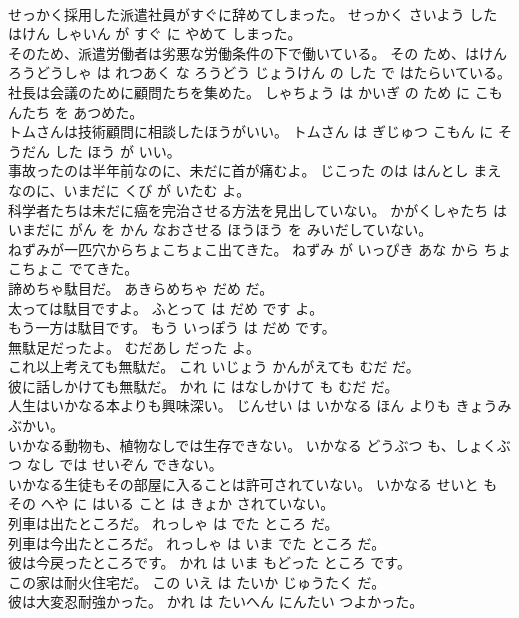 \documentclass[8pt]{extreport}
\begin{document}
\begin{CJK}{UTF8}{min}
\\	せっかく採用した派遣社員がすぐに辞めてしまった。	せっかく さいよう した はけん しゃいん が すぐ に やめて しまった。	
\\	そのため、派遣労働者は劣悪な労働条件の下で働いている。	その ため、はけんろうどうしゃ は れつあく な ろうどう じょうけん の した で はたらいている。	
\\	社長は会議のために顧問たちを集めた。	しゃちょう は かいぎ の ため に こもんたち を あつめた。	
\\	トムさんは技術顧問に相談したほうがいい。	トムさん は ぎじゅつ こもん に そうだん した ほう が いい。	
\\	事故ったのは半年前なのに、未だに首が痛むよ。	じこった のは はんとし まえ なのに、いまだに くび が いたむ よ。	
\\	科学者たちは未だに癌を完治させる方法を見出していない。	かがくしゃたち は いまだに がん を かん なおさせる ほうほう を みいだしていない。	
\\	ねずみが一匹穴からちょこちょこ出てきた。	ねずみ が いっぴき あな から ちょこちょこ でてきた。	
\\	諦めちゃ駄目だ。	あきらめちゃ だめ だ。	
\\	太っては駄目ですよ。	ふとって は だめ です よ。	
\\	もう一方は駄目です。	もう いっぽう は だめ です。	
\\	無駄足だったよ。	むだあし だった よ。	
\\	これ以上考えても無駄だ。	これ いじょう かんがえても むだ だ。	
\\	彼に話しかけても無駄だ。	かれ に はなしかけて も むだ だ。	
\\	人生はいかなる本よりも興味深い。	じんせい は いかなる ほん よりも きょうみぶかい。	
\\	いかなる動物も、植物なしでは生存できない。	いかなる どうぶつ も、しょくぶつ なし では せいぞん できない。	
\\	いかなる生徒もその部屋に入ることは許可されていない。	いかなる せいと も その へや に はいる こと は きょか されていない。	
\\	列車は出たところだ。	れっしゃ は でた ところ だ。	
\\	列車は今出たところだ。	れっしゃ は いま でた ところ だ。	
\\	彼は今戻ったところです。	かれ は いま もどった ところ です。	
\\	この家は耐火住宅だ。	この いえ は たいか じゅうたく だ。	
\\	彼は大変忍耐強かった。	かれ は たいへん にんたい つよかった。	

\end{CJK}
\end{document}
